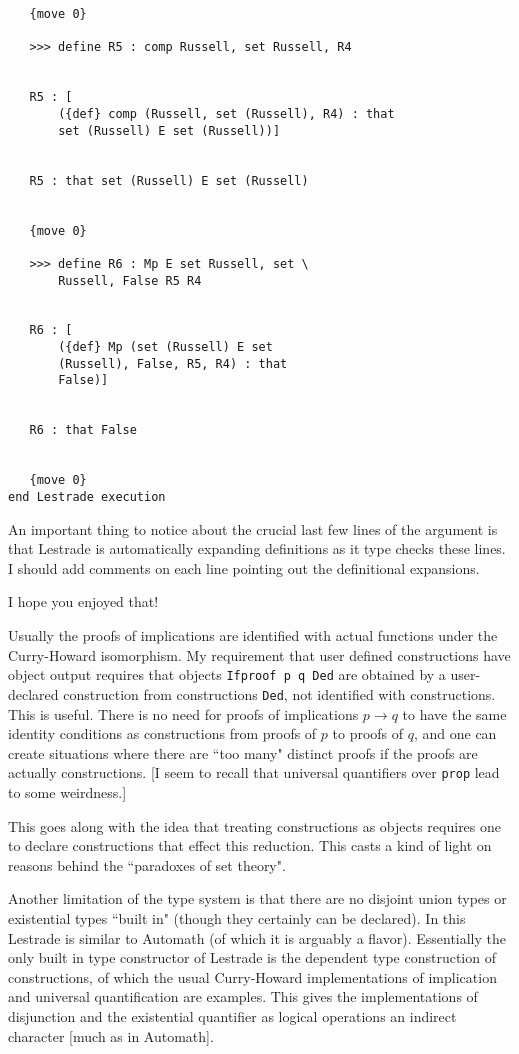 \documentclass[12pt]{article}
\begin{document}
\begin{verbatim}
   {move 0}

   >>> define R5 : comp Russell, set Russell, R4


   R5 : [
       ({def} comp (Russell, set (Russell), R4) : that 
       set (Russell) E set (Russell))]


   R5 : that set (Russell) E set (Russell)


   {move 0}

   >>> define R6 : Mp E set Russell, set \
       Russell, False R5 R4


   R6 : [
       ({def} Mp (set (Russell) E set 
       (Russell), False, R5, R4) : that 
       False)]


   R6 : that False


   {move 0}
end Lestrade execution
\end{verbatim}

An important thing to notice about the crucial last few lines of the argument is that Lestrade is automatically expanding definitions as it type checks these lines.  I should add comments on each line pointing out the definitional expansions.

I hope you enjoyed that!

Usually the proofs of implications are identified with actual functions under the Curry-Howard isomorphism.    My requirement that user defined constructions have object
output requires that objects {\tt Ifproof p q Ded} are obtained by a user-declared construction from constructions  {\tt Ded}, not identified with constructions.  This is useful.
There is no need for proofs of implications $p \rightarrow q$ to have the same identity conditions as constructions from proofs of $p$ to proofs of $q$, and one can
create situations where there are ``too many" distinct proofs if the proofs are actually constructions.  [I seem to recall that universal quantifiers over {\tt prop} lead to some weirdness.]

This goes along with the idea that treating constructions as objects requires one to declare constructions that effect this reduction.  This casts a kind of light on reasons behind the ``paradoxes of set theory".

Another limitation of the type system is that there are no disjoint union types or existential types ``built in" (though they certainly can be declared).  In this Lestrade is similar to Automath (of which it is arguably a flavor).  Essentially the only built in type constructor of Lestrade is the dependent type construction of constructions, of which the usual Curry-Howard implementations of implication and universal quantification are examples.  This gives the implementations of disjunction and the existential quantifier as logical operations an indirect character [much as in Automath].
\end{document}
